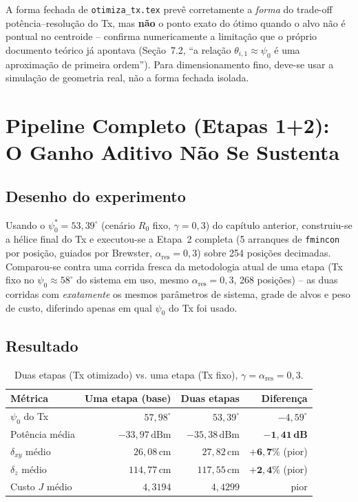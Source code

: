 \documentclass[12pt,a4paper,oneside]{book}
\newcommand{\result}[2]{%
  \begin{tcolorbox}[enhanced, breakable,
    colback=yellow!8, colframe=orange!70!black,
    fonttitle=\bfseries,
    title={\protect#1},
    attach boxed title to top left={yshift=-2mm, xshift=5mm},
    boxed title style={colback=orange!70!black}]
    #2
  \end{tcolorbox}}
\theoremstyle{definition}
\theoremstyle{remark}
\newcommand{\dxy}{\delta_{xy}}
\newcommand{\dz}{\delta_z}
\begin{document}
\result{Conclusão do Capítulo}{
A forma fechada de \texttt{otimiza\_tx.tex} prevê corretamente a
\emph{forma} do trade-off potência--resolução do Tx, mas \textbf{não} o
ponto exato do ótimo quando o alvo não é pontual no centroide -- confirma
numericamente a limitação que o próprio documento teórico já apontava
(Seção~7.2, ``a relação $\theta_{i,1}\approx\psi_0$ é uma aproximação de
primeira ordem''). Para dimensionamento fino, deve-se usar a simulação de
geometria real, não a forma fechada isolada.
}

\chapter{Pipeline Completo (Etapas 1+2): O Ganho Aditivo Não Se Sustenta}
\label{cap:pipeline_completo}

\section{Desenho do experimento}

Usando o $\psi_0^*=53{,}39^\circ$ (cenário $R_0$ fixo, $\gamma=0{,}3$) do
capítulo anterior, construiu-se a hélice final do Tx e executou-se a
Etapa~2 completa (5 arranques de \texttt{fmincon} por posição, guiados por
Brewster, $\alpha_{\mathrm{res}}=0{,}3$) sobre 254 posições decimadas.
Comparou-se contra uma corrida fresca da metodologia atual de uma etapa
(Tx fixo no $\psi_0\approx58^\circ$ do sistema em uso, mesmo
$\alpha_{\mathrm{res}}=0{,}3$, 268 posições) -- as duas corridas com
\emph{exatamente} os mesmos parâmetros de sistema, grade de alvos e peso de
custo, diferindo apenas em qual $\psi_0$ do Tx foi usado.

\section{Resultado}

\begin{table}[H]
\centering
\caption{Duas etapas (Tx otimizado) vs. uma etapa (Tx fixo), $\gamma=\alpha_{\mathrm{res}}=0{,}3$.}
\label{tab:pipeline_03}
\begin{tabular}{lrrr}
\toprule
Métrica & Uma etapa (base) & Duas etapas & Diferença \\
\midrule
$\psi_0$ do Tx & $57{,}98^\circ$ & $53{,}39^\circ$ & $-4{,}59^\circ$ \\
Potência média & $-33{,}97\,\mathrm{dBm}$ & $-35{,}38\,\mathrm{dBm}$ & $\mathbf{-1{,}41\,dB}$ \\
$\dxy$ médio & $26{,}08\,\mathrm{cm}$ & $27{,}82\,\mathrm{cm}$ & $\mathbf{+6{,}7\%}$ (pior) \\
$\dz$ médio & $114{,}77\,\mathrm{cm}$ & $117{,}55\,\mathrm{cm}$ & $\mathbf{+2{,}4\%}$ (pior) \\
Custo $J$ médio & $4{,}3194$ & $4{,}4299$ & pior \\
\bottomrule
\end{tabular}
\end{table}
\end{document}
